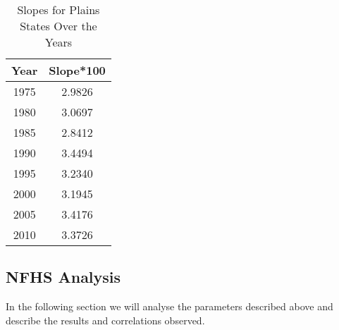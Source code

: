 \begin{table}[]
    \centering
    \caption{Slopes for Plains States Over the Years}
    \begin{tabular}{|c|c|}
    \hline
    \textbf{Year} & \textbf{Slope*100} \\ \hline
    1975          & 2.9826                 \\ \hline
    1980          & 3.0697                 \\ \hline
    1985          & 2.8412                 \\ \hline
    1990          & 3.4494                 \\ \hline
    1995          & 3.2340                 \\ \hline
    2000          & 3.1945                 \\ \hline
    2005          & 3.4176                 \\ \hline
    2010          & 3.3726                 \\ \hline
    \end{tabular}
    \label{tab:assembly_slopes_plains}
    \end{table}





\subsection{NFHS Analysis}
In the following section we will analyse the parameters described above and describe the results and correlations observed.
